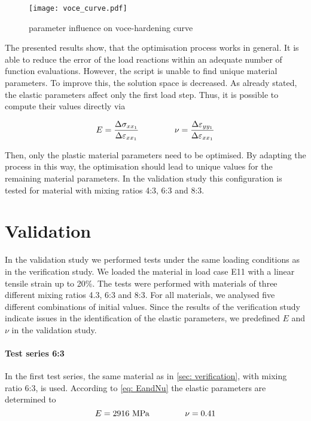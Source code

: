 \begin{figure}[H]
    \centering
    \texttt{[image: voce\_curve.pdf]}
    \caption{parameter influence on voce-hardening curve}
    \label{fig:voceCurve}
\end{figure}

The presented results show, that the optimisation process works in general. It is able to reduce the error of the load reactions within an adequate number of function evaluations. However, the script is unable to find unique material parameters. To improve this, the solution space is decreased. As already stated, the elastic parameters affect only the first load step. Thus, it is possible to compute their values directly via

\begin{gather}\label{eq: EandNu}
    E = \frac{\Delta\sigma_{xx_1}}{\Delta\varepsilon_{xx_1}} \hspace{1.5cm}
    \nu = \frac{\Delta\varepsilon_{yy_1}}{\Delta\varepsilon_{xx_1}}
\end{gather}
    
Then, only the plastic material parameters need to be optimised. By adapting the process in this way, the optimisation should lead to unique values for the remaining material parameters. In the validation study this configuration is tested for material with mixing ratios 4:3, 6:3 and 8:3. \\


\newpage
\section{Validation}\label{sec: validation}
In the validation study we performed tests under the same loading conditions as in the verification study.
We loaded the material in load case E11 with a linear tensile strain up to 20\%.
The tests were performed with materials of three different mixing ratios 4.3, 6:3 and 8:3. 
For all materials, we analysed five different combinations of initial values.
Since the results of the verification study indicate issues in the identification of the elastic parameters, we predefined $E$ and $\nu$ in the validation study. 

\paragraph{Test series 6:3}
In the first test series, the same material as in \autoref{sec: verification}, with mixing ratio 6:3, is used. According to \autoref{eq: EandNu} the elastic parameters are determined to 
\begin{equation*}
    E = 2916 \text{MPa} \hspace{1.5cm} \nu = 0.41 
\end{equation*}

